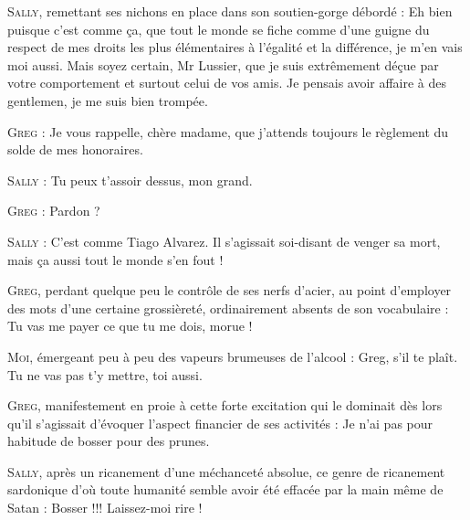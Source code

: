 \begin{dialogue}

\textsc{Sally}, remettant ses nichons en place dans son soutien-gorge débordé : Eh bien puisque c’est comme ça, que tout le monde se fiche comme d’une guigne du respect de mes droits les plus élémentaires à l’égalité et la différence, je m’en vais moi aussi. Mais soyez certain, Mr Lussier, que je suis extrêmement déçue par votre comportement et surtout celui de vos amis. Je pensais avoir affaire à des gentlemen, je me suis bien trompée.

\textsc{Greg} : Je vous rappelle, chère madame, que j’attends toujours le règlement du solde de mes honoraires.

\textsc{Sally} : Tu peux t’assoir dessus, mon grand.

\textsc{Greg} : Pardon ?

\textsc{Sally} : C’est comme Tiago Alvarez. Il s’agissait soi-disant de venger sa mort, mais ça aussi tout le monde s’en fout !

\textsc{Greg}, perdant quelque peu le contrôle de ses nerfs d’acier, au point d’employer des mots d’une certaine grossièreté, ordinairement absents de son vocabulaire : Tu vas me payer ce que tu me dois, morue !

\textsc{Moi}, émergeant peu à peu des vapeurs brumeuses de l’alcool : Greg, s’il te plaît. Tu ne vas pas t’y mettre, toi aussi.

\textsc{Greg}, manifestement en proie à cette forte excitation qui le dominait dès lors qu’il s’agissait d’évoquer l’aspect financier de ses activités : Je n’ai pas pour habitude de bosser pour des prunes.

\textsc{Sally}, après un ricanement d’une méchanceté absolue, ce genre de ricanement sardonique d’où toute humanité semble avoir été effacée par la main même de Satan : Bosser !!! Laissez-moi rire !

%


\end{dialogue}
